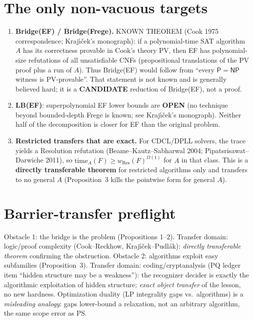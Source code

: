 \documentclass[11pt]{article}
\newcommand{\Pc}{\mathsf P}
\newcommand{\NP}{\mathsf{NP}}
\begin{document}
\section{The only non-vacuous targets}
\begin{enumerate}
\item \textbf{Bridge(EF) / Bridge(Frege).} KNOWN THEOREM (Cook 1975 correspondence; Kraj\'{\i}\v{c}ek's monograph):
if a polynomial-time SAT algorithm $A$ has its correctness provable in Cook's theory PV, then EF has
polynomial-size refutations of all unsatisfiable CNFs (propositional translations of the PV proof plus a
run of $A$). Thus Bridge(EF) would follow from ``every $\Pc=\NP$ witness is PV-provable''. That statement is
not known and is generally believed hard; it is a \textbf{CANDIDATE} reduction of Bridge(EF), not a proof.
\item \textbf{LB(EF)}: superpolynomial EF lower bounds are \textbf{OPEN} (no technique beyond
bounded-depth Frege is known; see Kraj\'{\i}\v{c}ek's monograph). Neither half of the decomposition is
closer for EF than the original problem.
\item \textbf{Restricted transfers that are exact.} For CDCL/DPLL solvers, the trace yields a Resolution
refutation (Beame--Kautz--Sabharwal 2004; Pipatsrisawat--Darwiche 2011), so
$\mathrm{time}_A(F)\ge w_{\mathrm{Res}}(F)^{\Omega(1)}$ for $A$ in that class. This is a
\textbf{directly transferable theorem} for restricted algorithms only and transfers to no general $A$
(Proposition~3 kills the pointwise form for general $A$).
\end{enumerate}

\section*{Barrier-transfer preflight}
Obstacle 1: the bridge is the problem (Propositions 1--2). Transfer domain: logic/proof complexity
(Cook--Reckhow, Kraj\'{\i}\v{c}ek--Pudlák): \emph{directly transferable theorem} confirming the obstruction.
Obstacle 2: algorithms exploit easy subfamilies (Proposition~3). Transfer domain: coding/cryptanalysis
(PQ ledger item ``hidden structure may be a weakness''): the recognizer decider is exactly the algorithmic
exploitation of hidden structure; \emph{exact object transfer} of the lesson, no new hardness.
Optimization duality (LP integrality gaps vs.\ algorithms) is a \emph{misleading analogy}: gaps lower-bound
a relaxation, not an arbitrary algorithm, the same scope error as $\mathrm{PS}$.
\end{document}
